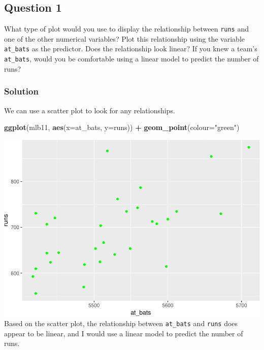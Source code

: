 \documentclass[]{article}
\newenvironment{Shaded}{\begin{snugshade}}{\end{snugshade}}
\newcommand{\KeywordTok}[1]{\textcolor[rgb]{0.13,0.29,0.53}{\textbf{#1}}}
\newcommand{\DataTypeTok}[1]{\textcolor[rgb]{0.13,0.29,0.53}{#1}}
\newcommand{\StringTok}[1]{\textcolor[rgb]{0.31,0.60,0.02}{#1}}
\newcommand{\OperatorTok}[1]{\textcolor[rgb]{0.81,0.36,0.00}{\textbf{#1}}}
\newcommand{\NormalTok}[1]{#1}
\begin{document}
\subsection{Question 1}\label{question-1}

What type of plot would you use to display the relationship between
\texttt{runs} and one of the other numerical variables? Plot this
relationship using the variable \texttt{at\_bats} as the predictor. Does
the relationship look linear? If you knew a team's \texttt{at\_bats},
would you be comfortable using a linear model to predict the number of
runs?

\subsubsection{Solution}\label{solution}

We can use a scatter plot to look for any relationships.

\begin{Shaded}
\begin{Highlighting}[]
\KeywordTok{ggplot}\NormalTok{(mlb11, }\KeywordTok{aes}\NormalTok{(}\DataTypeTok{x=}\NormalTok{at_bats, }\DataTypeTok{y=}\NormalTok{runs)) }\OperatorTok{+}
\StringTok{  }\KeywordTok{geom_point}\NormalTok{(}\DataTypeTok{colour=}\StringTok{"green"}\NormalTok{)}
\end{Highlighting}
\end{Shaded}

\includegraphics{DATA_606_Lab_7_files/figure-latex/quest-one-plot-1.pdf}
Based on the scatter plot, the relationship between \texttt{at\_bats}
and \texttt{runs} does appear to be linear, and I would use a linear
model to predict the number of runs.
\end{document}
